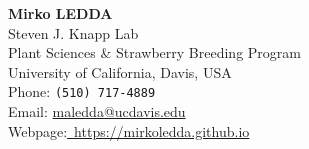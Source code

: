 \documentclass{CV}
\newcommand{\mail}[1]{\href{mailto:#1}{#1}}
\begin{document}
\begin{center}
	{\textbf{\LARGE Mirko LEDDA}}\\
	Steven J. Knapp Lab\\
	Plant Sciences \& Strawberry Breeding Program\\
	University of California, Davis, USA\\
	Phone: \texttt{(510) 717-4889}\\
	Email: \mail{maledda@ucdavis.edu}\\
	Webpage:\href{https://mirkoledda.github.io}{~https://mirkoledda.github.io}\\
\end{center}
~







\vspace{-1.5em}
\end{document}
